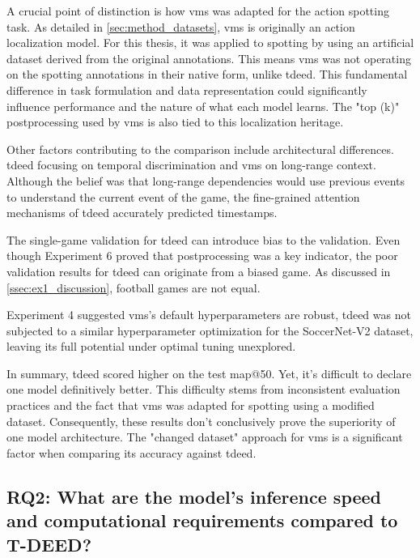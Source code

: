 A crucial point of distinction is how \acrshort{vms} was adapted for the action spotting task. As detailed in \cref{sec:method_datasets}, \acrshort{vms} is originally an action localization model. For this thesis, it was applied to spotting by using an artificial dataset derived from the original annotations. This means \acrshort{vms} was not operating on the spotting annotations in their native form, unlike \acrshort{tdeed}. This fundamental difference in task formulation and data representation could significantly influence performance and the nature of what each model learns. The "top (k)" postprocessing used by \acrshort{vms} is also tied to this localization heritage.

Other factors contributing to the comparison include architectural differences. \acrshort{tdeed} focusing on temporal discrimination and \acrshort{vms} on long-range context. Although the belief was that long-range dependencies would use previous events to understand the current event of the game, the fine-grained attention mechanisms of \acrshort{tdeed} accurately predicted timestamps. 

The single-game validation for \acrshort{tdeed} can introduce bias to the validation. Even though Experiment 6 proved that postprocessing was a key indicator, the poor validation results for \acrshort{tdeed} can originate from a biased game. As discussed in \cref{ssec:ex1_discussion}, football games are not equal. 

Experiment 4 suggested \acrshort{vms}'s default hyperparameters are robust, \acrshort{tdeed} was not subjected to a similar hyperparameter optimization for the SoccerNet-V2 dataset, leaving its full potential under optimal tuning unexplored.

In summary, \acrshort{tdeed} scored higher on the test \acrshort{map}@50. Yet, it's difficult to declare one model definitively better. This difficulty stems from inconsistent evaluation practices and the fact that \acrshort{vms} was adapted for spotting using a modified dataset. Consequently, these results don't conclusively prove the superiority of one model architecture. The "changed dataset" approach for \acrshort{vms} is a significant factor when comparing its accuracy against \acrshort{tdeed}.


\subsection{RQ2: What are the model’s inference speed and computational requirements compared to T-DEED?}

